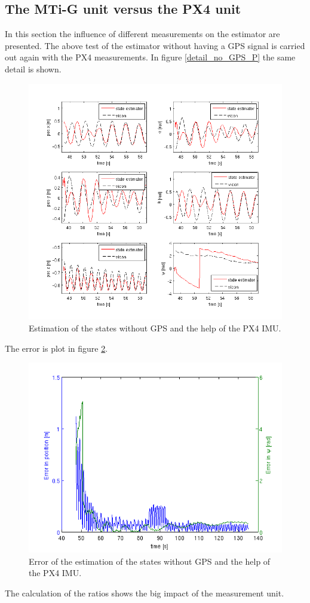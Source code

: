 \subsection{The MTi-G unit versus the PX4 unit}\label{IMU_comp}
In this section the influence of different measurements on the estimator are presented. The above test of the  estimator without having a GPS signal is carried out again with the PX4 measurements. In figure \ref{detail_no_GPS_P} the same detail is shown. 
\begin{figure}[h]
\centering
\includegraphics[width=1\textwidth]{pictures/2_2_P_detail_noGPS.png}
\caption{Estimation of the states without GPS and the help of the PX4 IMU.}
\label{detail_noGPS_P}
\end{figure}
The error is plot in figure \ref{error_noGPS_P}. 
\begin{figure}[h]
\centering
\includegraphics[width=1\textwidth]{pictures/2_2_P_errors_noGPS.png}
\caption{Error of the estimation of the states without GPS and the help of the PX4 IMU.}
\label{error_noGPS_P}
\end{figure}
The calculation of the ratios shows the big impact of the measurement unit.

